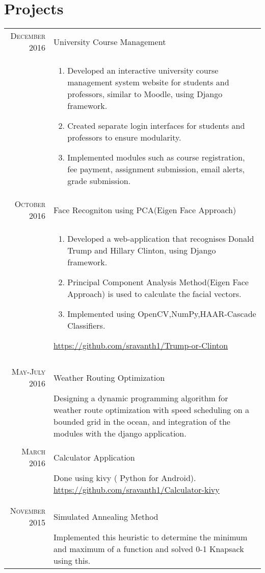 \documentclass[a4paper,10pt]{article}
\begin{document}
\section{Projects}
\begin{tabular}{r|p{10cm}}
\textsc{December 2016}& University Course Management\\&\footnotesize{\begin{enumerate}
    \item Developed an interactive university course management system website for students and professors, similar to Moodle, using Django framework.
    \item Created separate login interfaces for students and professors to ensure modularity.
    \item Implemented modules such as course registration, fee payment, assignment submission, email alerts, grade submission.
\end{enumerate}}
\\
\textsc{October 2016}& Face Recogniton using PCA(Eigen Face Approach)\\&\footnotesize{\begin{enumerate}
    \item Developed a web-application that recognises Donald Trump and Hillary Clinton, using Django framework.
    \item Principal Component Analysis Method(Eigen Face Approach) is used to calculate the facial vectors.
    \item Implemented using OpenCV,NumPy,HAAR-Cascade Classifiers.
\end{enumerate}
\href{https://github.com/sravanth1/Trump-or-Clinton}{https://github.com/sravanth1/Trump-or-Clinton}}\\
\\
\textsc{May-July 2016}& Weather Routing Optimization\\&\footnotesize{Designing a dynamic programming algorithm for weather route optimization with speed scheduling on a bounded grid in the ocean, and integration of the modules with the django application.}\\
\\
\textsc{March 2016}& Calculator Application\\&\footnotesize{Done using kivy ( Python for Android). \href{https://github.com/sravanth1/Calculator-kivy}{https://github.com/sravanth1/Calculator-kivy}}\\
\\\\
\textsc{November 2015}& Simulated Annealing Method\\&\footnotesize{Implemented this heuristic to determine the minimum and maximum of a function and solved 0-1 Knapsack using this.}
\end{tabular}
\end{document}

